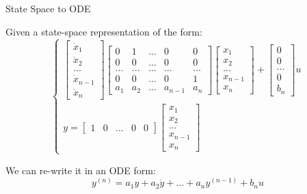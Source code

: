 \documentclass{beamer}
\begin{document}
\begin{frame}{State Space to ODE}
	\begin{flushleft}
		
		Given a state-space representation of the form:
		\begin{equation}
			\begin{cases}
				\begin{bmatrix}
					\dot x_1 \\ \dot x_2 \\  ... \\ \dot x_{n-1} \\ \dot x_n
				\end{bmatrix}
				\begin{bmatrix}
					0 & 1 & ... & 0 & 0 \\
					0 & 0& ... & 0 & 0 \\
					... & ... & ... & ... & ...  \\
					0 & 0& ... & 0 & 1 \\
					a_1 & a_2 & ... & a_{n-1} & a_n 
				\end{bmatrix}
				\begin{bmatrix}
					x_1 \\ x_2 \\  ... \\ x_{n-1} \\  x_n
				\end{bmatrix}
				+
				\begin{bmatrix}
					0 \\ 0 \\  ... \\ 0 \\  b_n
				\end{bmatrix}
				u
				\\
				y = 
				\begin{bmatrix}
					1 &0 &  ... &0 &  0
				\end{bmatrix}
				\begin{bmatrix}
				x_1 \\ x_2 \\  ... \\ x_{n-1} \\  x_n
				\end{bmatrix}
			\end{cases}
		\end{equation}
		
		We can re-write it in an ODE form:
		\begin{equation}
			y^{(n)} = a_1 y + a_2 \dot y + ... + a_n y^{(n-1)} + b_n u
		\end{equation}
		
		
	\end{flushleft}
\end{frame}
\end{document}
